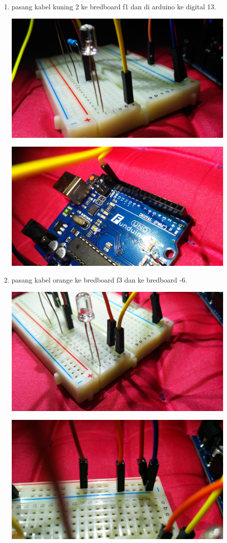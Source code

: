 \documentclass{article}
\begin{document}
\begin{enumerate}
	\break
	\item pasang kabel kuning 2 ke bredboard f1 dan di arduino ke digital 13.
	\break
	\centerline{\includegraphics[width=0.9\textwidth]{figures/13.jpg}}
	\break
	\centerline{\includegraphics[width=0.9\textwidth]{figures/14.jpg}}
	\break
	\item pasang kabel orange ke bredboard f3 dan ke bredboard -6.
	\break
	\centerline{\includegraphics[width=0.9\textwidth]{figures/15.jpg}}
	\break
	\centerline{\includegraphics[width=0.9\textwidth]{figures/16.jpg}}

\end{enumerate}
\end{document}

